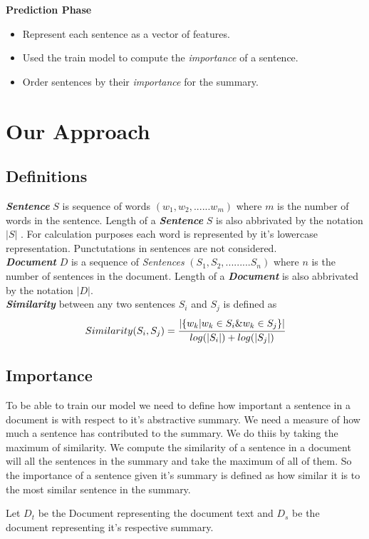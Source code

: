 \documentclass[paper=a4, fontsize=11pt]{scrartcl} %
\numberwithin{equation}{section} %
\numberwithin{figure}{section} %
\numberwithin{table}{section} %
\begin{document}
\textbf{ Prediction Phase }
	\begin{itemize}
		\item Represent each sentence as a vector of features.
		\item Used the train model to compute the \emph{importance} of a sentence.
		\item Order sentences by their \emph{importance} for the summary.
	\end{itemize}

\section{Our Approach}
\subsection{Definitions}
\textbf{\textit{Sentence}} $S$ is sequence of words $(w_1, w_2, ...... w_m )$ where $m$ is the number of words in the sentence. Length of a \textbf{\textit{Sentence}} $S$ is also abbrivated by the notation $|S|$ . For calculation purposes each word is represented by it's lowercase representation. Punctutations in sentences are not considered.\\

\textbf{\textit{Document}} $D$ is a sequence of \emph{Sentences} $(S_1, S_2, ......... S_n)$ where $n$ is the number of sentences in the document. Length of a \textbf{\textit{Document}} is also abbrivated by the notation $|D|$. \\

\textbf{\textit{Similarity}} between any two sentences $S_i$ and $S_j$ is defined as 
\begin{align}
 Similarity(S_i,S_j) =  { \cfrac{ |\{w_k | w_k \in S_i \&w_k \in S_j\}| }{log(|S_i|) + log(|S_j|)} }
\end{align}

\subsection{Importance}
To be able to train our model we need to define how important a sentence in a document is with respect to it's abstractive summary. We need a measure of how much a sentence has contributed to the summary. We do thiis by taking the maximum of similarity. We compute the similarity of a sentence in a document will all the sentences in the summary and take the maximum of all of them. So the importance of a sentence given it's summary is defined as how similar it is to the most similar sentence in the summary.\\
\par
Let $D_t$ be the Document representing the document text and $D_s$ be the document representing it's respective summary.\\
\end{document}
